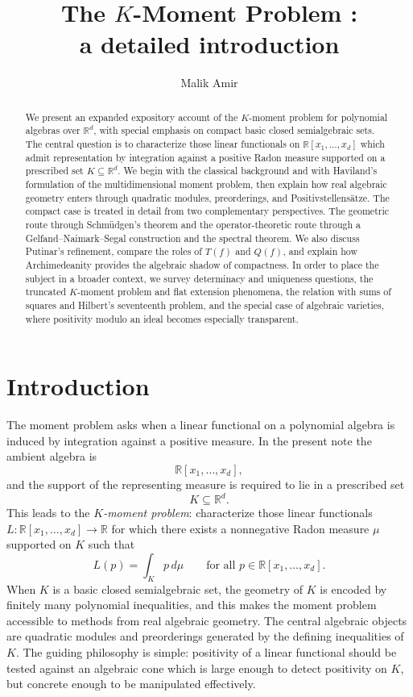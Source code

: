 \documentclass[11pt]{amsart}
\title[The $K$-Moment Problem]{The $K$-Moment Problem :\\ a detailed introduction }
\author[M. Amir]{Malik Amir}
\numberwithin{equation}{section}
\theoremstyle{definition}
\theoremstyle{remark}
\newcommand{\R}{\mathbb{R}}
\newcommand{\Rxd}{\R[x_1,\dots,x_d]}
\newcommand{\1}{\mathbf{1}}
\begin{document}
\begin{abstract}
We present an expanded expository account of the $K$-moment problem for polynomial algebras over \(\R^d\), with special emphasis on compact basic closed semialgebraic sets. The central question is to characterize those linear functionals on \(\R[x_1,\dots,x_d]\) which admit representation by integration against a positive Radon measure supported on a prescribed set \(K\subseteq\R^d\). We begin with the classical background and with Haviland's formulation of the multidimensional moment problem, then explain how real algebraic geometry enters through quadratic modules, preorderings, and Positivstellens\"atze. The compact case is treated in detail from two complementary perspectives. The geometric route through Schm\"udgen's theorem and the operator-theoretic route through a Gelfand--Naimark--Segal construction and the spectral theorem. We also discuss Putinar's refinement, compare the roles of \(T(f)\) and \(Q(f)\), and explain how Archimedeanity provides the algebraic shadow of compactness. In order to place the subject in a broader context, we survey determinacy and uniqueness questions, the truncated \(K\)-moment problem and flat extension phenomena, the relation with sums of squares and Hilbert's seventeenth problem, and the special case of algebraic varieties, where positivity modulo an ideal becomes especially transparent.
\end{abstract}

\maketitle
\tableofcontents

\section{Introduction}

The moment problem asks when a linear functional on a polynomial algebra is induced by integration against a positive measure. In the present note the ambient algebra is
\[
\Rxd,
\]
and the support of the representing measure is required to lie in a prescribed set
\[
K\subseteq \R^d.
\]
This leads to the \emph{$K$-moment problem}: characterize those linear functionals \(L:\Rxd\to\R\) for which there exists a nonnegative Radon measure \(\mu\) supported on \(K\) such that
\[
L(p)=\int_K p\,d\mu \qquad \text{for all } p\in\Rxd.
\]
When \(K\) is a basic closed semialgebraic set, the geometry of \(K\) is encoded by finitely many polynomial inequalities, and this makes the moment problem accessible to methods from real algebraic geometry. The central algebraic objects are quadratic modules and preorderings generated by the defining inequalities of \(K\). The guiding philosophy is simple: positivity of a linear functional should be tested against an algebraic cone which is large enough to detect positivity on \(K\), but concrete enough to be manipulated effectively.
\end{document}
